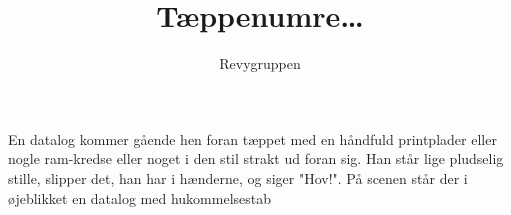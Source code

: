 \documentclass[danish]{article}
\title{Tæppenumre\ldots}
\author{Revygruppen}
\begin{document}
\maketitle

\begin{sketch}

\scene En datalog kommer gående hen foran tæppet med en håndfuld printplader
eller nogle ram-kredse eller noget i den stil strakt ud foran sig. Han
står lige pludselig stille, slipper det, han har i hænderne, og siger
"Hov!".
 På scenen står der i øjeblikket en datalog med hukommelsestab

\end{sketch}
\end{document}
